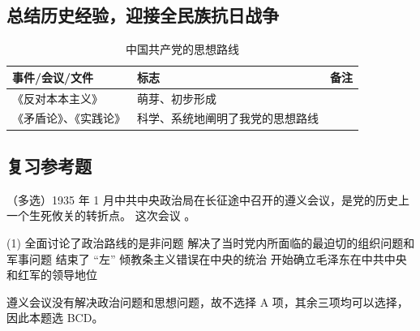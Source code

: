 \documentclass[10pt, UTF8]{book} %
\begin{document}


\subsection{总结历史经验，迎接全民族抗日战争}

\begin{table}[H]
    \centering
    \caption{中国共产党的思想路线}
    \begin{tabular}{p{}|p{}p{}}
        \hline 
        \textbf{事件/会议/文件} & \textbf{标志} & \textbf{备注} \\ 
        \hline 
        《反对本本主义》 & 萌芽、初步形成 & \\ 
        \hline 
        《矛盾论》、《实践论》 & 科学、系统地阐明了我党的思想路线 \\ 
        \hline
    \end{tabular}
\end{table}

\subsection{复习参考题}

\begin{example}
    （多选）1935 年 1 月中共中央政治局在长征途中召开的遵义会议，是党的历史上一个生死攸关的转折点。
    这次会议 \underline{\qquad \qquad \qquad}。
    \begin{tasks}[label={\Alph*. }](1)
        \task 全面讨论了政治路线的是非问题
        \task 解决了当时党内所面临的最迫切的组织问题和军事问题
        \task 结束了 “左” 倾教条主义错误在中央的统治
        \task 开始确立毛泽东在中共中央和红军的领导地位
    \end{tasks}
    \begin{sol}
        遵义会议没有解决政治问题和思想问题，故不选择 A 项，其余三项均可以选择，
        因此本题选 BCD。
    \end{sol}
\end{example}
\end{document}
